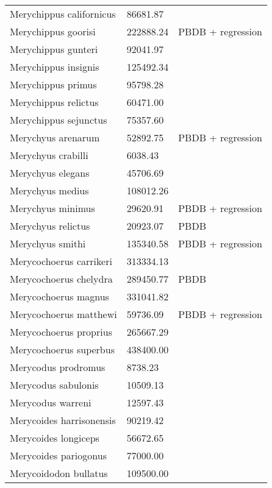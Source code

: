 \begin{center}
\begin{longtable}{p{} p{} p{} }
  Merychippus californicus & 86681.87 & \cite{Tomiya2013} \\ 
  Merychippus goorisi & 222888.24 & PBDB + regression \\ 
  Merychippus gunteri & 92041.97 & \cite{Tomiya2013} \\ 
  Merychippus insignis & 125492.34 & \cite{Tomiya2013} \\ 
  Merychippus primus & 95798.28 & \cite{Tomiya2013} \\ 
  Merychippus relictus & 60471.00 & \cite{McKenna2011} \\ 
  Merychippus sejunctus & 75357.60 & \cite{Tomiya2013} \\ 
  Merychyus arenarum & 52892.75 & PBDB + regression \\ 
  Merychyus crabilli & 6038.43 & \cite{Johanson1996} \\ 
  Merychyus elegans & 45706.69 & \cite{Tomiya2013} \\ 
  Merychyus medius & 108012.26 & \cite{Tomiya2013} \\ 
  Merychyus minimus & 29620.91 & PBDB + regression \\ 
  Merychyus relictus & 20923.07 & PBDB \\ 
  Merychyus smithi & 135340.58 & PBDB + regression \\ 
  Merycochoerus carrikeri & 313334.13 & \cite{Rose2011a} \\ 
  Merycochoerus chelydra & 289450.77 & PBDB \\ 
  Merycochoerus magnus & 331041.82 & \cite{Tomiya2013} \\ 
  Merycochoerus matthewi & 59736.09 & PBDB + regression \\ 
  Merycochoerus proprius & 265667.29 & \cite{Tomiya2013} \\ 
  Merycochoerus superbus & 438400.00 & \cite{McKenna2011} \\ 
  Merycodus prodromus & 8738.23 & \cite{Kelley1954} \\ 
  Merycodus sabulonis & 10509.13 & \cite{Tomiya2013} \\ 
  Merycodus warreni & 12597.43 & \cite{Baskin2004} \\ 
  Merycoides harrisonensis & 90219.42 & \cite{Tomiya2013} \\ 
  Merycoides longiceps & 56672.65 & \cite{Stock1948} \\ 
  Merycoides pariogonus & 77000.00 & \cite{McKenna2011} \\ 
  Merycoidodon bullatus & 109500.00 & \cite{McKenna2011} \\ 

\end{longtable}
\end{center}
